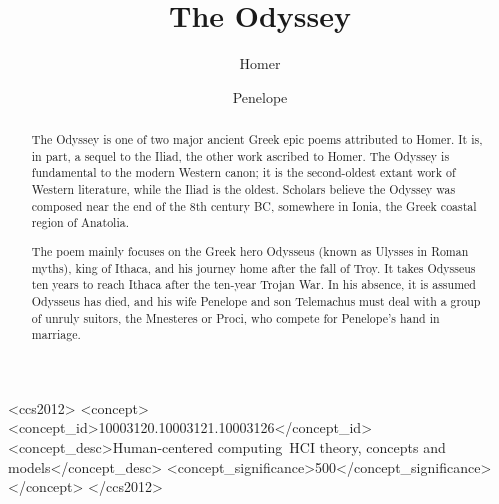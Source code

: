 \documentclass[sigconf]{acmart}
\begin{document}
\title{The Odyssey}

\author{Homer}

\author{Penelope}

\renewcommand{\shortauthors}{Homer et al.}


\begin{abstract}
The Odyssey is one of two major ancient Greek epic poems attributed to Homer.
It is, in part, a sequel to the Iliad, the other work ascribed to Homer. The
Odyssey is fundamental to the modern Western canon; it is the second-oldest
extant work of Western literature, while the Iliad is the oldest. Scholars
believe the Odyssey was composed near the end of the 8th century BC, somewhere
in Ionia, the Greek coastal region of Anatolia.

The poem mainly focuses on the Greek hero Odysseus (known as Ulysses in Roman
myths), king of Ithaca, and his journey home after the fall of Troy. It takes
Odysseus ten years to reach Ithaca after the ten-year Trojan War. In his
absence, it is assumed Odysseus has died, and his wife Penelope and son
Telemachus must deal with a group of unruly suitors, the Mnesteres or Proci,
who compete for Penelope's hand in marriage.\cite{mit-homer}
\end{abstract}

%
%
\begin{CCSXML}
<ccs2012>
<concept>
<concept_id>10003120.10003121.10003126</concept_id>
<concept_desc>Human-centered computing~HCI theory, concepts and models</concept_desc>
<concept_significance>500</concept_significance>
</concept>
</ccs2012>
\end{CCSXML}



\maketitle









\end{document}
